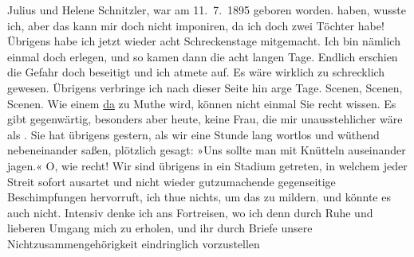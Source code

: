 \begin{ledgroupsized}[t]{13cm}
{{{                     Julius und Helene Schnitzler, war am 11. 7. 1895 geboren worden.}}}\label{K_L03159-3h} haben, wusste ich, aber das kann mir
               doch nicht imponiren, da ich doch zwei Töchter habe! Übrigens habe ich jetzt wieder acht
               Schreckenstage mitgemacht. Ich bin nämlich einmal doch erlegen, und so kamen dann die
               acht langen Tage. Endlich erschien die Gefahr doch beseitigt und ich atmete auf. Es
               wäre wirklich zu schrecklich gewesen. Übrigens verbringe ich nach dieser Seite hin
               arge Tage. Scenen, Scenen, Scenen. Wie einem \uline{da} zu
               Muthe wird, können nicht einmal Sie recht wissen. Es gibt gegenwärtig, besonders aber
                  heute, keine Frau, die mir unausstehlicher wäre als
                  \label{K_L03159-4v}\label{K_L03159-4h}. Sie hat übrigens gestern, als wir eine Stunde
               lang wortlos und wüthend nebeneinander saßen, plötzlich gesagt: »Uns sollte man mit
               Knütteln auseinander jagen.« O, wie recht! Wir sind übrigens in ein Stadium getreten,
               in welchem jeder Streit sofort ausartet und nicht wieder gutzumachende gegenseitige
               Beschimpfungen hervorruft, ich thue nichts, um das zu mildern\textcolor{gray}{,}{ }{\pb}und könnte es auch nicht.
               Intensiv denke ich ans Fortreisen, wo ich denn durch Ruhe und lieberen Umgang mich zu
               erholen, und ihr durch Briefe unsere Nichtzusammengehörigkeit eindringlich vorzustellen

\end{ledgroupsized}
